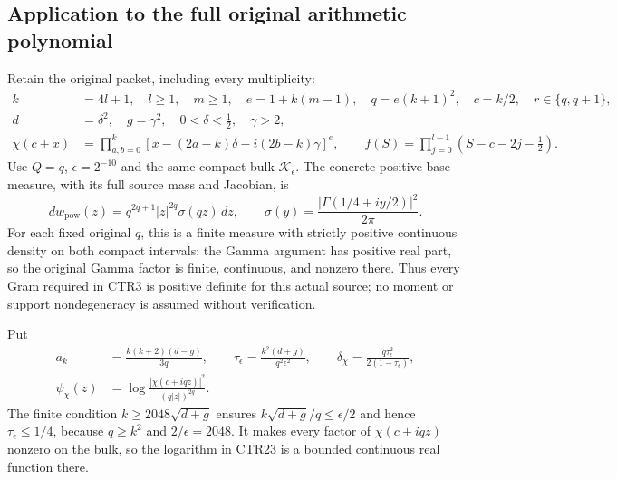 \subsection{Application to the full original arithmetic polynomial}
Retain the original packet, including every multiplicity:
\[
 \begin{split}
 k&=4l+1,\quad l\geq1,\quad m\geq1,\quad e=1+k(m-1),\quad
 q=e(k+1)^2,\quad c=k/2,\quad r\in\{q,q+1\},\\
 d&=\delta^2,\quad g=\gamma^2,\quad 0<\delta<\tfrac12,\quad\gamma>2,\\
 \chi(c+x)&=\prod_{a,b=0}^k
       [x-(2a-k)\delta-i(2b-k)\gamma]^e,\qquad
 f(S)=\prod_{j=0}^{l-1}(S-c-2j-\tfrac12).
 \end{split}
 \tag{CTR21}
\]
Use $Q=q$, $\epsilon=2^{-10}$ and the same compact bulk
$\mathcal K_\epsilon$. The concrete positive base measure, with its full
source mass and Jacobian, is
\[
 dw_{\mathrm{pow}}(z)
   =q^{2q+1}|z|^{2q}\sigma(qz)\,dz,\qquad
 \sigma(y)=\frac{|\Gamma(1/4+iy/2)|^2}{2\pi}.
 \tag{CTR22}
\]
For each fixed original $q$, this is a finite measure with strictly
positive continuous density on both compact intervals: the Gamma
argument has positive real part, so the original Gamma factor is finite,
continuous, and nonzero there. Thus every Gram required in CTR3 is
positive definite for this actual source; no moment or support
nondegeneracy is assumed without verification.

Put
\[
 \begin{split}
 a_k&=\frac{k(k+2)(d-g)}{3q},\qquad
 \tau_\epsilon=\frac{k^2(d+g)}{q^2\epsilon^2},\qquad
 \delta_\chi=\frac{q\tau_\epsilon^2}{2(1-\tau_\epsilon)},\\
 \psi_\chi(z)&=\log\frac{|\chi(c+iqz)|^2}{(q|z|)^{2q}}.
 \end{split}
 \tag{CTR23}
\]
The finite condition $k\geq2048\sqrt{d+g}$ ensures
$k\sqrt{d+g}/q\leq\epsilon/2$ and hence $\tau_\epsilon\leq1/4$,
because $q\geq k^2$ and $2/\epsilon=2048$.
It makes every factor of $\chi(c+iqz)$ nonzero on the bulk, so the
logarithm in CTR23 is a bounded continuous real function there.

